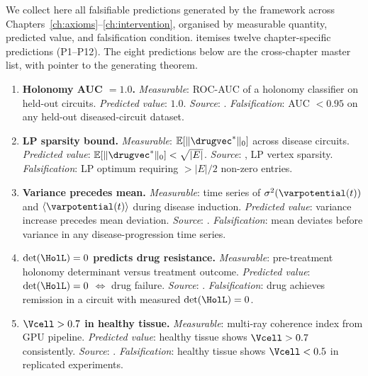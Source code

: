 We collect here all falsifiable predictions generated by the framework across
Chapters~\ref{ch:axioms}--\ref{ch:intervention}, organised by measurable
quantity, predicted value, and falsification condition.
 itemises twelve chapter-specific predictions (P1--P12).
The eight predictions below are the cross-chapter master list, with pointer
to the generating theorem.

\begin{enumerate}[label=\textbf{M\arabic*.}, leftmargin=3em]

\item \textbf{Holonomy AUC $= 1.0$.}
  \emph{Measurable}: ROC-AUC of a holonomy classifier on held-out circuits.
  \emph{Predicted value}: $1.0$.
  \emph{Source}: .
  \emph{Falsification}: AUC $< 0.95$ on any held-out diseased-circuit dataset.

\item \textbf{LP sparsity bound.}
  \emph{Measurable}: $\mathbb{E}[\|\drugvec^*\|_0]$ across disease circuits.
  \emph{Predicted value}: $\mathbb{E}[\|\drugvec^*\|_0] < \sqrt{|E|}$.
  \emph{Source}: , LP vertex sparsity.
  \emph{Falsification}: LP optimum requiring $> |E|/2$ non-zero entries.

\item \textbf{Variance precedes mean.}
  \emph{Measurable}: time series of $\sigma^2(\varpotential(t))$ and
    $\langle\varpotential(t)\rangle$ during disease induction.
  \emph{Predicted value}: variance increase precedes mean deviation.
  \emph{Source}: .
  \emph{Falsification}: mean deviates before variance in any disease-progression
    time series.

\item \textbf{$\det(\HolL) = 0$ predicts drug resistance.}
  \emph{Measurable}: pre-treatment holonomy determinant versus treatment outcome.
  \emph{Predicted value}: $\det(\HolL) = 0$ $\Leftrightarrow$ drug failure.
  \emph{Source}: .
  \emph{Falsification}: drug achieves remission in a circuit with measured
    $\det(\HolL) = 0$.

\item \textbf{$\Vcell > 0.7$ in healthy tissue.}
  \emph{Measurable}: multi-ray coherence index from GPU pipeline.
  \emph{Predicted value}: healthy tissue shows $\Vcell > 0.7$ consistently.
  \emph{Source}: .
  \emph{Falsification}: healthy tissue shows $\Vcell < 0.5$ in replicated
    experiments.


\end{enumerate}
